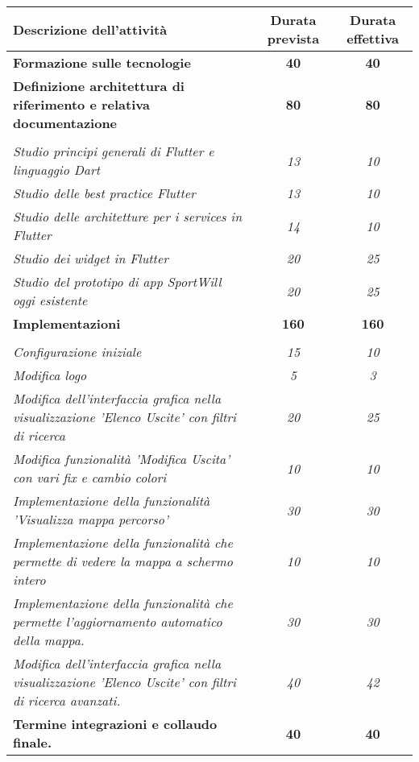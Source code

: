 \begin{center}
	\begin{table}[h!]
		
		\label{tab:Confronto tra ore previste e ore effettive}
		\begin{tabularx}{\textwidth}{|X|c|c|}
			
			\hline
			\textbf{Descrizione dell'attività} & \textbf{Durata prevista} & \textbf{Durata effettiva}  \\\hline
			
			\textbf{Formazione sulle tecnologie} & \textbf{40} & \textbf{40} \\	 
			\hline
			
			\textbf{Definizione architettura di riferimento e relativa documentazione} & \textbf{80} & \textbf{80} \\  \hdashline
			\multirow{3}{0cm}\\ 
			\textit{Studio principi generali di Flutter e linguaggio Dart} & \textit{13} & \textit{10} \\
			\textit{Studio delle best practice Flutter} & \textit{13} & \textit{10} 
			 \\
			\textit{Studio delle architetture per i services in Flutter} & \textit{14} & \textit{10}
			 \\
			\textit{Studio dei widget in Flutter} & \textit{20} & \textit{25}  \\
			\textit{Studio del prototipo di app SportWill oggi esistente} & \textit{20} & \textit{25} \\
			\hline
			\textbf{Implementazioni} & \textbf{160} & \textbf{160} \\ \hdashline
			\multirow{3}{0cm}\\
			\textit{Configurazione iniziale} & \textit{15} & \textit{10} \\ 			 
			\textit{Modifica logo} & \textit{5} & \textit{3} \\ 		 
			\textit{Modifica dell’interfaccia grafica nella visualizzazione ’Elenco Uscite’ con filtri di ricerca} & \textit{20} & \textit{25} \\
			\textit{Modifica funzionalità 'Modifica Uscita' con vari fix e cambio colori} & \textit{10} & \textit{10} \\
			\textit{Implementazione della funzionalità 'Visualizza mappa percorso'} & \textit{30} & \textit{30} \\
			\textit{Implementazione della funzionalità che permette di vedere la mappa a schermo intero} & \textit{10} & \textit{10} \\ 
			\textit{Implementazione della funzionalità che permette l'aggiornamento automatico della mappa.} & \textit{30} & \textit{30} \\
			\textit{Modifica dell'interfaccia grafica nella visualizzazione 'Elenco Uscite' con filtri di ricerca avanzati.} & \textit{40} & \textit{42} \\
			\hline
			\textbf{Termine integrazioni e collaudo finale.} & \textbf{40} & \textbf{40}\\ 
			\hline
			

\end{tabularx}
\end{table}
\end{center}
